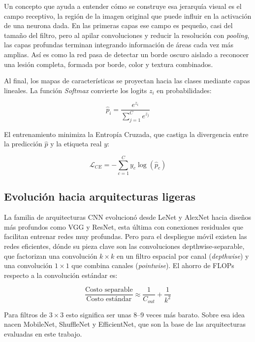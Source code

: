 \documentclass[12pt,letterpaper]{article}
\begin{document}
Un concepto que ayuda a entender c\'omo se construye esa jerarqu\'ia visual es el campo receptivo, la regi\'on de la imagen original que puede influir en la activaci\'on de una neurona dada. En las primeras capas ese campo es peque\~no, casi del tama\~no del filtro, pero al apilar convoluciones y reducir la resoluci\'on con \textit{pooling}, las capas profundas terminan integrando informaci\'on de \'areas cada vez m\'as amplias. As\'i es como la red pasa de detectar un borde oscuro aislado a reconocer una lesi\'on completa, formada por borde, color y textura combinados.

Al final, los mapas de caracter\'isticas se proyectan hacia las clases mediante capas lineales. La funci\'on \textit{Softmax} convierte los logits $z_i$ en probabilidades:

\begin{equation}
\hat{p}_i = \frac{e^{z_i}}{\sum_{j=1}^{C} e^{z_j}}
\end{equation}

El entrenamiento minimiza la Entrop\'ia Cruzada, que castiga la divergencia entre la predicci\'on $\hat{p}$ y la etiqueta real $y$:

\begin{equation}
\mathcal{L}_{CE} = -\sum_{c=1}^{C} y_c \log(\hat{p}_c)
\label{eq:ce}
\end{equation}

\subsection{Evoluci\'on hacia arquitecturas ligeras}

La familia de arquitecturas CNN evolucion\'o desde LeNet y AlexNet hacia dise\~nos m\'as profundos como VGG y ResNet, esta \'ultima con conexiones residuales que facilitan entrenar redes muy profundas. Pero para el despliegue m\'ovil existen  las redes eficientes, dónde su pieza clave son las convoluciones depthwise-separable, que factorizan una convoluci\'on $k\times k$ en un filtro espacial por canal (\textit{depthwise}) y una convoluci\'on $1\times 1$ que combina canales (\textit{pointwise}). El ahorro de FLOPs respecto a la convoluci\'on est\'andar es:

\begin{equation}
\frac{\text{Costo separable}}{\text{Costo est\'andar}} \approx \frac{1}{C_{out}} + \frac{1}{k^2}
\end{equation}

Para filtros de $3\times 3$ esto significa ser unas 8--9 veces m\'as barato. Sobre esa idea nacen MobileNet, ShuffleNet y EfficientNet, que son la base de las arquitecturas evaluadas en este trabajo.
\end{document}
